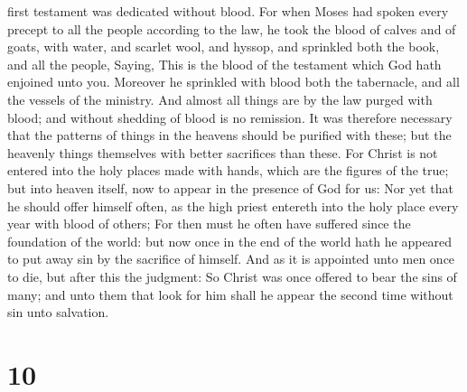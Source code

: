 first testament was dedicated without blood.  For when
Moses had spoken every precept to all the people according to the law,
he took the blood of calves and of goats, with water, and scarlet wool,
and hyssop, and sprinkled both the book, and all the people,
 Saying, This is the blood of the testament which God hath
enjoined unto you.  Moreover he sprinkled with blood both
the tabernacle, and all the vessels of the ministry.  And
almost all things are by the law purged with blood; and without shedding
of blood is no remission.  It was therefore necessary that
the patterns of things in the heavens should be purified with these; but
the heavenly things themselves with better sacrifices than these.
 For Christ is not entered into the holy places made with
hands, which are the figures of the true; but into heaven itself, now to
appear in the presence of God for us:  Nor yet that he
should offer himself often, as the high priest entereth into the holy
place every year with blood of others;  For then must he
often have suffered since the foundation of the world: but now once in
the end of the world hath he appeared to put away sin by the sacrifice
of himself.  And as it is appointed unto men once to die,
but after this the judgment:  So Christ was once offered to
bear the sins of many; and unto them that look for him shall he appear
the second time without sin unto salvation.

\hypertarget{section-9}{%
\section{10}\label{section-9}}

